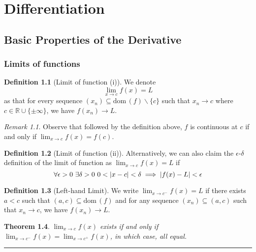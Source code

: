 \documentclass[12pt, lettersize]{book}
\theoremstyle{plain}
\newtheorem{thm}{Theorem}[section]
\theoremstyle{definition}
\newtheorem{dfn}[thm]{Definition}
\theoremstyle{remark}
\newtheorem*{rem}{Remark}
\newcommand{\R}{\mathbb{R}}
\newcommand{\dom}{\text{dom}\,}
\newcommand{\lline}{\noindent\rule{\textwidth}{1pt}}
\begin{document}
	\chapter{Differentiation}
		\newpage
		\section{Basic Properties of the Derivative}
		\subsection*{Limits of functions}
		\begin{dfn}[Limit of function (i)]
			We denote 
			\begin{displaymath}
				\lim_{x\rightarrow c}f(x)=L
			\end{displaymath}
			as that for every sequence $(x_n)\subseteq\dom(f)\backslash\{c\}$ such that $x_n\rightarrow c$ where $c\in\R\cup\{\pm\infty\}$, we have $f(x_n)\rightarrow L$.
		\end{dfn}
		\begin{rem}
			Observe that followed by the definition above, $f$ is continuous at $c$ if and only if $\lim_{x\rightarrow c}f(x)=f(c)$.
		\end{rem}
		
		\begin{dfn}[Limit of function (ii)]
			Alternatively, we can also claim the $\epsilon$-$\delta$ definition of the limit of function as $\lim_{x\rightarrow c}f(x)=L$ if
			\begin{displaymath}
				\forall\epsilon>0\ \exists\delta>0\ 0<\abs{x-c}<\delta\implies\abs{f(x)-L}<\epsilon
			\end{displaymath}	
		\end{dfn}
		
		\begin{dfn}[Left-hand Limit]
			We write $\lim_{x\rightarrow c^-}f(x)=L$ if there exists $a<c$ such that $(a,c)\subseteq\dom(f)$ and for any sequence $(x_n)\subseteq(a,c)$ such that $x_n\rightarrow c$, we have $f(x_n)\rightarrow L$.
		\end{dfn}
		
		\begin{thm}
			$\lim_{x\rightarrow c}f(x)$ exists if and only if $\lim_{x\rightarrow c^-}f(x)=\lim_{x\rightarrow c^+}f(x)$, in which case, all equal.
		\end{thm}
		\newpage
		\lline
		
\end{document}
